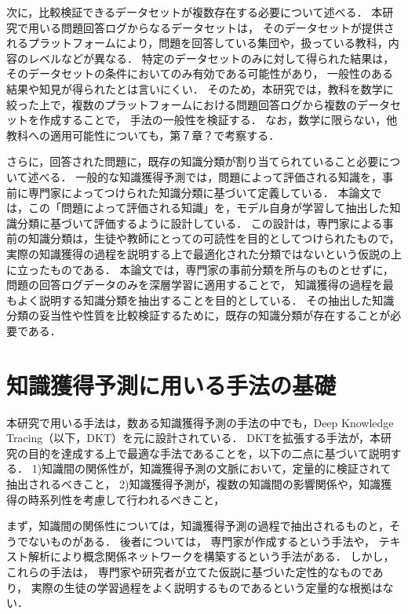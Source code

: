 次に，比較検証できるデータセットが複数存在する必要について述べる．
本研究で用いる問題回答ログからなるデータセットは，
そのデータセットが提供されるプラットフォームにより，問題を回答している集団や，扱っている教科，内容のレベルなどが異なる．
特定のデータセットのみに対して得られた結果は，そのデータセットの条件においてのみ有効である可能性があり，
一般性のある結果や知見が得られたとは言いにくい．
そのため，本研究では，教科を数学に絞った上で，複数のプラットフォームにおける問題回答ログから複数のデータセットを作成することで，
手法の一般性を検証する．
なお，数学に限らない，他教科への適用可能性についても，第７章？で考察する．


さらに，回答された問題に，既存の知識分類が割り当てられていること必要について述べる．
一般的な知識獲得予測では，問題によって評価される知識を，事前に専門家によってつけられた知識分類に基づいて定義している．
本論文では，この「問題によって評価される知識」を，モデル自身が学習して抽出した知識分類に基づいて評価するように設計している．
この設計は，専門家による事前の知識分類は，生徒や教師にとっての可読性を目的としてつけられたもので，
実際の知識獲得の過程を説明する上で最適化された分類ではないという仮説の上に立ったものである．
本論文では，専門家の事前分類を所与のものとせずに，問題の回答ログデータのみを深層学習に適用することで，
知識獲得の過程を最もよく説明する知識分類を抽出することを目的としている．
その抽出した知識分類の妥当性や性質を比較検証するために，既存の知識分類が存在することが必要である．



\section{知識獲得予測に用いる手法の基礎}
本研究で用いる手法は，数ある知識獲得予測の手法の中でも，Deep Knowledge Tracing（以下，DKT）を元に設計されている．
DKTを拡張する手法が，本研究の目的を達成する上で最適な手法であることを，以下の二点に基づいて説明する．
1)知識間の関係性が，知識獲得予測の文脈において，定量的に検証されて抽出されるべきこと，
2)知識獲得予測が，複数の知識間の影響関係や，知識獲得の時系列性を考慮して行われるべきこと，


まず，知識間の関係性については，知識獲得予測の過程で抽出されるものと，そうでないものがある．
後者については，
専門家が作成するという手法や，
テキスト解析により概念関係ネットワークを構築するという手法\cite{chen2008mining}がある．
しかし，これらの手法は，
専門家や研究者が立てた仮説に基づいた定性的なものであり，
実際の生徒の学習過程をよく説明するものであるという定量的な根拠はない．

